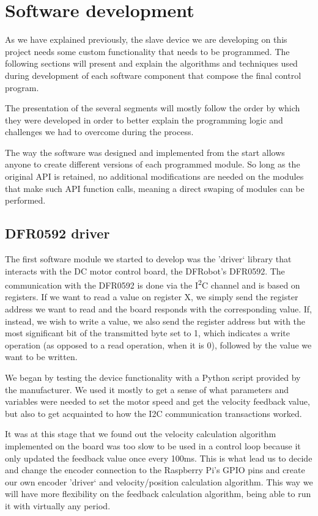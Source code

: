 \section{Software development} \label{sec:software-devel}
As we have explained previously, the slave device we are developing on this project needs some custom functionality that needs to be programmed.
The following sections will present and explain the algorithms and techniques used during development of each software component that compose the final control program.

The presentation of the several segments will mostly follow the order by which they were developed in order to better explain the programming logic and challenges we had to overcome during the process.

The way the software was designed and implemented from the start allows anyone to create different versions of each programmed module.
So long as the original API is retained, no additional modifications are needed on the modules that make such API function calls, meaning a direct swaping of modules can be performed.

\subsection{DFR0592 driver}
The first software module we started to develop was the 'driver` library that interacts with the DC motor control board, the DFRobot's DFR0592.
The communication with the DFR0592 is done via the I\textsuperscript{2}C channel and is based on registers.
If we want to read a value on register X, we simply send the register address we want to read and the board responds with the corresponding value.
If, instead, we wish to write a value, we also send the register address but with the most significant bit of the transmitted byte set to 1, which indicates a write operation (as opposed to a read operation, when it is 0), followed by the value we want to be written.

We began by testing the device functionality with a Python \cite{sw:python} script provided by the manufacturer.
We used it mostly to get a sense of what parameters and variables were needed to set the motor speed and get the velocity feedback value, but also to get acquainted to how the I2C communication transactions worked.

It was at this stage that we found out the velocity calculation algorithm implemented on the board was too slow to be used in a control loop because it only updated the feedback value once every 100ms.
This is what lead us to decide and change the encoder connection to the Raspberry Pi's GPIO pins and create our own encoder 'driver` and velocity/position calculation algorithm.
This way we will have more flexibility on the feedback calculation algorithm, being able to run it with virtually any period.

